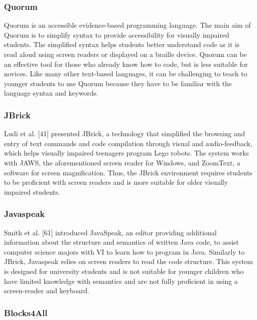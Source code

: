 \documentclass[oneside,%
                    author={Malak Hajji},
                    degree={BSc},
                    title={Designing An Accessible Computational Toolkit For Students},
                  subtitle={With Mixed Visual Abilities}]{dissertation}
\begin{document}
\subsubsection{Quorum}
Quorum is an accessible evidence-based programming language. The main aim of Quorum is to simplify syntax to provide accessibility for visually impaired students. The simplified syntax helps students better understand code as it is read aloud using screen readers or displayed on a braille device. Quorum can be an effective tool for those who already know how to code, but is less suitable for novices. Like many other text-based languages, it can be challenging to teach to younger students to use Quorum because they have to be familiar with the language syntax and keywords.

\subsubsection{JBrick}
Ludi et al. [41] presented JBrick, a technology that simplified the browsing and entry of text commands and code compilation through visual and audio-feedback, which helps visually impaired teenagers program Lego robots. The system works with JAWS, the aforementioned screen reader for Windows, and ZoomText, a software for screen magnification. Thus, the JBrick environment requires students to be proficient with screen readers and is more suitable for older visually impaired students.

\subsubsection{Javaspeak}
Smith et al. [61] introduced JavaSpeak, an editor providing additional information about the structure and semantics of written Java code, to assist computer science majors with VI to learn how to program in Java. Similarly to JBrick, Javaspeak  relies on screen readers to read the code structure. This system is designed for university students and is not suitable for younger children who have limited knowledge with semantics and are not fully proficient in using a screen-reader and keyboard.

\subsubsection{Blocks4All}
\end{document}

